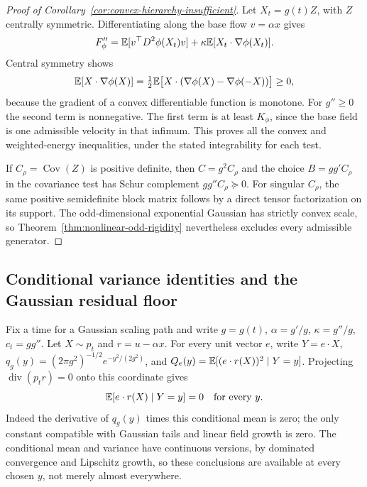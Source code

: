 \begin{proof}[Proof of Corollary~\ref{cor:convex-hierarchy-insufficient}]
Let $X_t=g(t)Z$, with $Z$ centrally symmetric.  Differentiating along
the base flow $v=\alpha x$ gives
\[
 F_\phi''=\mathbb E[v^\top D^2\phi(X_t)v]
             +\kappa\mathbb E[X_t\cdot\nabla\phi(X_t)].
\]
Central symmetry shows
\[
 \mathbb E[X\cdot\nabla\phi(X)]
 =\tfrac12\mathbb E\bigl[X\cdot
       (\nabla\phi(X)-\nabla\phi(-X))\bigr]\ge0,
\]
because the gradient of a convex differentiable function is monotone.
For $g''\ge0$ the second term is nonnegative.  The first term is at
least $K_\phi$, since the base field is one admissible velocity in that
infimum.  This proves all the convex and weighted-energy inequalities,
under the stated integrability for each test.

If $C_\rho=\operatorname{Cov}(Z)$ is positive definite, then
$C=g^2C_\rho$ and the choice $B=gg'C_\rho$ in the covariance test has
Schur complement $gg''C_\rho\succeq0$.  For singular $C_\rho$, the
same positive semidefinite block matrix follows by a direct tensor
factorization on its support.  The odd-dimensional exponential Gaussian
has strictly convex scale, so Theorem~\ref{thm:nonlinear-odd-rigidity}
nevertheless excludes every admissible generator.
\end{proof}

\subsection{Conditional variance identities and the Gaussian residual floor}

Fix a time for a Gaussian scaling path and write $g=g(t)$,
$\alpha=g'/g$, $\kappa=g''/g$, $c_t=gg''$.  Let $X\sim p_t$ and
$r=u-\alpha x$.  For every unit vector $e$, write $Y=e\cdot X$,
$q_g(y)=(2\pi g^2)^{-1/2}e^{-y^2/(2g^2)}$, and
$Q_e(y)=\mathbb E[(e\cdot r(X))^2\mid Y=y]$.
Projecting $\operatorname{div}(p_tr)=0$ onto this coordinate gives
\begin{equation}
 \mathbb E[e\cdot r(X)\mid Y=y]=0\quad\text{for every }y.
 \label{eq:projected-gauge-mean}
\end{equation}
Indeed the derivative of $q_g(y)$ times this conditional mean is zero;
the only constant compatible with Gaussian tails and linear field growth
is zero.  The conditional mean and variance have continuous versions,
by dominated convergence and Lipschitz growth, so these conclusions are
available at every chosen $y$, not merely almost everywhere.


